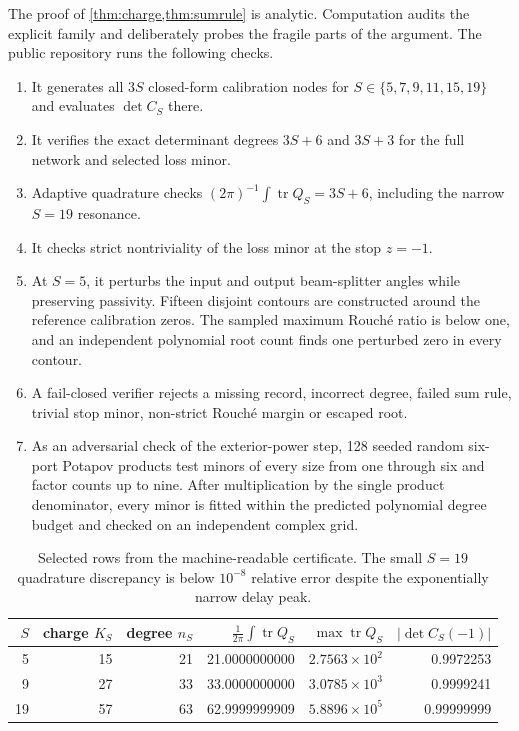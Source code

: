 \documentclass[11pt]{article}
\theoremstyle{definition}
\theoremstyle{remark}
\newcommand{\tr}{\operatorname{tr}}
\begin{document}
The proof of \cref{thm:charge,thm:sumrule} is analytic.  Computation audits the
explicit family and deliberately probes the fragile parts of the argument.
The public repository \cite{ErikssonMemoryRepository2026} runs the following
checks.
\begin{enumerate}
 \item It generates all $3S$ closed-form calibration nodes for
 $S\in\{5,7,9,11,15,19\}$ and evaluates $\det C_S$ there.
 \item It verifies the exact determinant degrees $3S+6$ and $3S+3$ for the
 full network and selected loss minor.
 \item Adaptive quadrature checks
 $(2\pi)^{-1}\int\tr Q_S=3S+6$, including the narrow $S=19$ resonance.
 \item It checks strict nontriviality of the loss minor at the stop $z=-1$.
 \item At $S=5$, it perturbs the input and output beam-splitter angles while
 preserving passivity.  Fifteen disjoint contours are constructed around the
 reference calibration zeros.  The sampled maximum Rouch\'e ratio is below
 one, and an independent polynomial root count finds one perturbed zero in
 every contour.
 \item A fail-closed verifier rejects a missing record, incorrect degree,
 failed sum rule, trivial stop minor, non-strict Rouch\'e margin or escaped
 root.
 \item As an adversarial check of the exterior-power step, 128 seeded random
 six-port Potapov products test minors of every size from one through six and
 factor counts up to nine.  After multiplication by the single product
 denominator, every minor is fitted within the predicted polynomial degree
 budget and checked on an independent complex grid.
\end{enumerate}

\begin{table}[htbp]
\centering
\small
\begin{tabular}{@{}rrrrrr@{}}
\toprule
$S$ & charge $K_S$ & degree $n_S$ & $\frac1{2\pi}\int\tr Q_S$
& $\max\tr Q_S$ & $|\det C_S(-1)|$\\
\midrule
5  & 15 & 21 & 21.0000000000 & $2.7563\times10^2$ & 0.9972253\\
9  & 27 & 33 & 33.0000000000 & $3.0785\times10^3$ & 0.9999241\\
19 & 57 & 63 & 62.9999999909 & $5.8896\times10^5$ & 0.99999999\\
\bottomrule
\end{tabular}
\caption{Selected rows from the machine-readable certificate.  The small
$S=19$ quadrature discrepancy is below $10^{-8}$ relative error despite the
exponentially narrow delay peak.}
\label{tab:audit}
\end{table}
\end{document}
